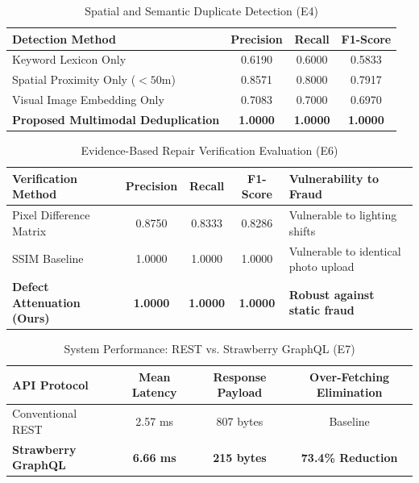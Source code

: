 \begin{table}[htbp]
\caption{Spatial and Semantic Duplicate Detection (E4)}
\label{tab:duplicate_detection}
\centering
\begin{tabular}{|l|c|c|c|}
\hline
\textbf{Detection Method} & \textbf{Precision} & \textbf{Recall} & \textbf{F1-Score} \\
\hline
Keyword Lexicon Only & 0.6190 & 0.6000 & 0.5833 \\
Spatial Proximity Only ($<50$m) & 0.8571 & 0.8000 & 0.7917 \\
Visual Image Embedding Only & 0.7083 & 0.7000 & 0.6970 \\
\textbf{Proposed Multimodal Deduplication} & \textbf{1.0000} & \textbf{1.0000} & \textbf{1.0000} \\
\hline
\end{tabular}
\end{table}

\begin{table}[htbp]
\caption{Evidence-Based Repair Verification Evaluation (E6)}
\label{tab:repair_verification}
\centering
\begin{tabular}{|l|c|c|c|l|}
\hline
\textbf{Verification Method} & \textbf{Precision} & \textbf{Recall} & \textbf{F1-Score} & \textbf{Vulnerability to Fraud} \\
\hline
Pixel Difference Matrix & 0.8750 & 0.8333 & 0.8286 & Vulnerable to lighting shifts \\
SSIM Baseline & 1.0000 & 1.0000 & 1.0000 & Vulnerable to identical photo upload \\
\textbf{Defect Attenuation (Ours)} & \textbf{1.0000} & \textbf{1.0000} & \textbf{1.0000} & \textbf{Robust against static fraud} \\
\hline
\end{tabular}
\end{table}

\begin{table}[htbp]
\caption{System Performance: REST vs. Strawberry GraphQL (E7)}
\label{tab:system_performance}
\centering
\begin{tabular}{|l|c|c|c|}
\hline
\textbf{API Protocol} & \textbf{Mean Latency} & \textbf{Response Payload} & \textbf{Over-Fetching Elimination} \\
\hline
Conventional REST & 2.57 ms & 807 bytes & Baseline \\
\textbf{Strawberry GraphQL} & \textbf{6.66 ms} & \textbf{215 bytes} & \textbf{73.4\% Reduction} \\
\hline
\end{tabular}
\end{table}

